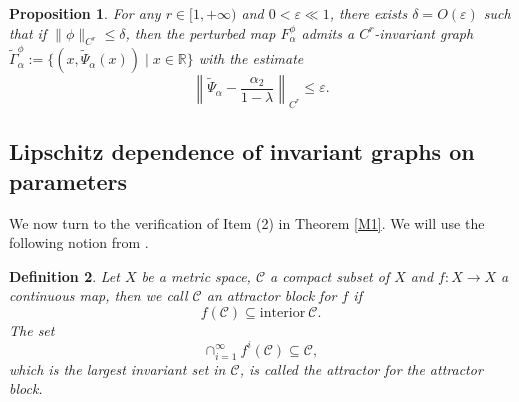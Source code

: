 \documentclass{amsart}
\newcommand{\eps}{\varepsilon}
\newtheorem{Definition}{Definition}[section]
\newtheorem{Proposition}[Definition]{Proposition}
\theoremstyle{definition}
\begin{document}
\begin{Proposition}\label{nhim}
For any $r \in [1,+\infty)$ and $0 < \eps \ll 1$, there exists $\delta = O(\eps)$ such that if $\|\phi\|_{C^r} \leq \delta$, then the perturbed map $F^{\phi}_\alpha$ admits a $C^r$-invariant graph $\tilde{\Gamma}_\alpha^\phi := \{(x, \tilde{\Psi}_{\alpha}(x)) \mid x \in \mathbb{R}\}$ with the estimate
\[
\left\|\tilde{\Psi}_\alpha - \frac{\alpha_2}{1-\lambda}\right\|_{C^r} \leq \eps.
\]
\end{Proposition}



\subsection{Lipschitz dependence of invariant graphs on parameters}
We now turn to the verification of Item (2) in Theorem \ref{M1}.  We will use the following notion from \cite{Co}.
\begin{Definition}
Let $X$ be a metric space, $\mathcal{C}$ a compact subset of $X$ and $f:X\to X$ a continuous map, then we call $\mathcal{C}$ an attractor block for $f$ if
\[f(\mathcal{C})\subseteq \mathrm{interior}\ \mathcal{C}.\]
The set
\[\cap_{i=1}^\infty f^i(\mathcal{C})\subseteq \mathcal{C},\]
which is the largest invariant set in $\mathcal{C}$, is called the attractor for the attractor block.
\end{Definition}
\end{document}
